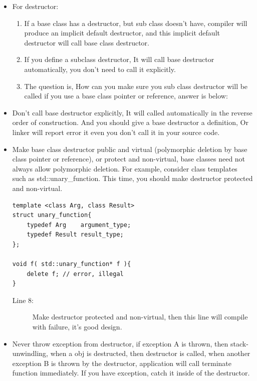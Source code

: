 \documentclass[a4paper,11pt,twoside]{book}
\begin{document}
\begin{itemize}
	\item For destructor:
	\begin{enumerate}
		\item If a base class has a destructor, but sub class doesn't have,  compiler will produce an implicit default destructor, and this implicit default destructor will call base class destructor.
		
		\item If you define a subclass destructor, It will call base destructor automatically, you don't need to call it explicitly.
		
		\item The question is, How can you make sure you sub class destructor will be called if you use a base class pointer or reference, answer is below:
	\end{enumerate}
	
	\item Don't call base destructor explicitly, It will called automatically in the reverse order of construction.  And you should give a base destructor a definition, Or linker will report error it even you don't call it in your source code.
	
	\item Make base class destructor public and virtual (polymorphic deletion by base class pointer or reference), or protect and non-virtual, base classes need not always allow polymorphic deletion. For example, consider class templates such as std::unary\_function. This time, you should make destructor protected and non-virtual.
\begin{lstlisting}[numbers=none]
template <class Arg, class Result>
struct unary_function{
	typedef Arg    argument_type;
	typedef Result result_type;
};
	
void f( std::unary_function* f ){
	delete f; // error, illegal
}
\end{lstlisting}
\begin{description}
	\item[Line 8:] Make destructor protected and non-virtual, then this line will compile with failure, it's good design. 
\end{description}
	
	
	\item Never throw exception from destructor, if exception A is thrown, then stack-unwindling, when a obj is destructed, then destructor is called, when another exception B is thrown by the destructor, application will call terminate function immediately.  If you have exception, catch it inside of the destructor.
	
\end{itemize}
\end{document}
